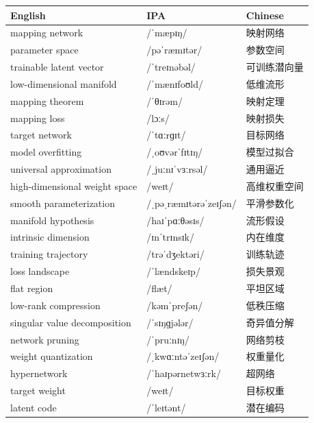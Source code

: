\documentclass[UTF8,12pt,a4paper]{ctexart}
\providecommand{\zh}[1]{#1}
\begin{document}
\begin{tabular*}{\textwidth}{@{\extracolsep{\fill}}lll@{}}
\toprule
\textbf{English} & \textbf{IPA} & \textbf{Chinese} \\
\midrule
mapping network & {\ipafont /ˈmæpɪŋ/} & \zh{映射网络} \\
parameter space & {\ipafont /pəˈræmɪtər/} & \zh{参数空间} \\
trainable latent vector & {\ipafont /ˈtreɪnəbəl/} & \zh{可训练潜向量} \\
low-dimensional manifold & {\ipafont /ˈmænɪfoʊld/} & \zh{低维流形} \\
mapping theorem & {\ipafont /ˈθɪrəm/} & \zh{映射定理} \\
mapping loss & {\ipafont /lɔːs/} & \zh{映射损失} \\
target network & {\ipafont /ˈtɑːrɡɪt/} & \zh{目标网络} \\
model overfitting & {\ipafont /ˌoʊvərˈfɪtɪŋ/} & \zh{模型过拟合} \\
universal approximation & {\ipafont /ˌjuːnɪˈvɜːrsəl/} & \zh{通用逼近} \\
high-dimensional weight space & {\ipafont /weɪt/} & \zh{高维权重空间} \\
smooth parameterization & {\ipafont /ˌpəˌræmɪtərəˈzeɪʃən/} & \zh{平滑参数化} \\
manifold hypothesis & {\ipafont /haɪˈpɑːθəsɪs/} & \zh{流形假设} \\
intrinsic dimension & {\ipafont /ɪnˈtrɪnsɪk/} & \zh{内在维度} \\
training trajectory & {\ipafont /trəˈdʒektəri/} & \zh{训练轨迹} \\
loss landscape & {\ipafont /ˈlændskeɪp/} & \zh{损失景观} \\
flat region & {\ipafont /flæt/} & \zh{平坦区域} \\
low-rank compression & {\ipafont /kəmˈpreʃən/} & \zh{低秩压缩} \\
singular value decomposition & {\ipafont /ˈsɪŋɡjələr/} & \zh{奇异值分解} \\
network pruning & {\ipafont /ˈpruːnɪŋ/} & \zh{网络剪枝} \\
weight quantization & {\ipafont /ˌkwɑːntəˈzeɪʃən/} & \zh{权重量化} \\
hypernetwork & {\ipafont /ˈhaɪpərnetwɜːrk/} & \zh{超网络} \\
target weight & {\ipafont /weɪt/} & \zh{目标权重} \\
latent code & {\ipafont /ˈleɪtənt/} & \zh{潜在编码} \\

\end{tabular*}
\end{document}
